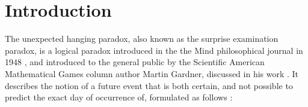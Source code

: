 \documentclass[journal]{journal}
\begin{document}
\section{Introduction}
%
%
%
%
%
%



The unexpected hanging paradox, also known as the surprise examination paradox,
is a logical paradox introduced in the the Mind philosophical journal in 1948 \cite{original},
and introduced to the general public by the Scientific American Mathematical
Games column author Martin Gardner, discussed in his work \cite{diversions}.
It describes the notion of a future event that
is both certain, and not possible to predict the exact day of occurrence of,
formulated as follows :
\end{document}
